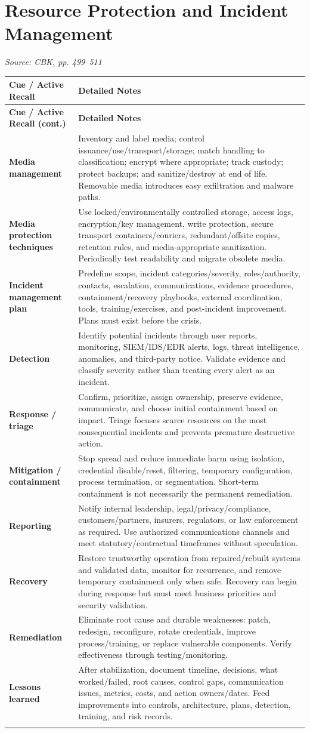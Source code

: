 \documentclass[10pt,letterpaper]{article}
\makeatletter
\newenvironment{cornell}{\rowcolors{2}{white}{notebg}\begin{longtable}{@{}>{\raggedright\arraybackslash\columncolor{cuebg}\color{navy}\bfseries}p{0.285\textwidth}>{\raggedright\arraybackslash}p{0.65\textwidth}@{}}\rowcolor{navy}\color{white}\textbf{Cue / Active Recall} & \color{white}\textbf{Detailed Notes}\\ \hline\endfirsthead\rowcolor{navy}\color{white}\textbf{Cue / Active Recall (cont.)} & \color{white}\textbf{Detailed Notes}\\ \hline\endhead}{\end{longtable}}
\newcommand{\noterow}[2]{#1 & #2\\\arrayrulecolor{line}\hline}\newcommand{\source}[1]{\par{\footnotesize\color{teal}\textit{Source: CBK, #1}}\par}
\makeatother
\begin{document}
\section{\color{navy}Resource Protection and Incident Management}
\source{pp. 499--511}
\begin{cornell}
\noterow{Media management}{Inventory and label media; control issuance/use/transport/storage; match handling to classification; encrypt where appropriate; track custody; protect backups; and sanitize/destroy at end of life. Removable media introduces easy exfiltration and malware paths.}
\noterow{Media protection techniques}{Use locked/environmentally controlled storage, access logs, encryption/key management, write protection, secure transport containers/couriers, redundant/offsite copies, retention rules, and media-appropriate sanitization. Periodically test readability and migrate obsolete media.}
\noterow{Incident management plan}{Predefine scope, incident categories/severity, roles/authority, contacts, escalation, communications, evidence procedures, containment/recovery playbooks, external coordination, tools, training/exercises, and post-incident improvement. Plans must exist before the crisis.}
\noterow{Detection}{Identify potential incidents through user reports, monitoring, SIEM/IDS/EDR alerts, logs, threat intelligence, anomalies, and third-party notice. Validate evidence and classify severity rather than treating every alert as an incident.}
\noterow{Response / triage}{Confirm, prioritize, assign ownership, preserve evidence, communicate, and choose initial containment based on impact. Triage focuses scarce resources on the most consequential incidents and prevents premature destructive action.}
\noterow{Mitigation / containment}{Stop spread and reduce immediate harm using isolation, credential disable/reset, filtering, temporary configuration, process termination, or segmentation. Short-term containment is not necessarily the permanent remediation.}
\noterow{Reporting}{Notify internal leadership, legal/privacy/compliance, customers/partners, insurers, regulators, or law enforcement as required. Use authorized communications channels and meet statutory/contractual timeframes without speculation.}
\noterow{Recovery}{Restore trustworthy operation from repaired/rebuilt systems and validated data, monitor for recurrence, and remove temporary containment only when safe. Recovery can begin during response but must meet business priorities and security validation.}
\noterow{Remediation}{Eliminate root cause and durable weaknesses: patch, redesign, reconfigure, rotate credentials, improve process/training, or replace vulnerable components. Verify effectiveness through testing/monitoring.}
\noterow{Lessons learned}{After stabilization, document timeline, decisions, what worked/failed, root causes, control gaps, communication issues, metrics, costs, and action owners/dates. Feed improvements into controls, architecture, plans, detection, training, and risk records.}
\end{cornell}
\end{document}
